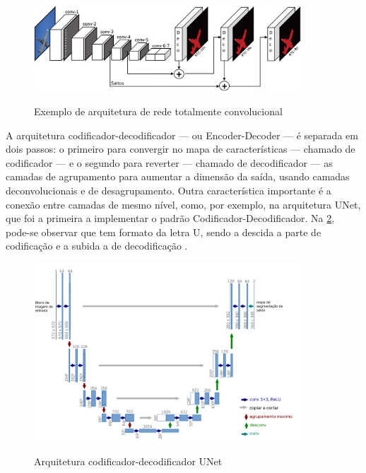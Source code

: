 \begin{figure}[ht]
    \caption{Exemplo de arquitetura de rede totalmente convolucional}
    \centering %
    \includegraphics[width=10cm]{figures/redes_totalmente_convolucionais.png} %
    \label{fig:rtc}
\end{figure}

A arquitetura codificador-decodificador — ou Encoder-Decoder — é separada em dois passos: o primeiro para convergir no mapa de características — chamado de codificador — e o segundo para reverter — chamado de decodificador — as camadas de agrupamento para aumentar a dimensão da saída, usando camadas deconvolucionais e de desagrupamento. Outra característica importante é a conexão entre camadas de mesmo nível, como, por exemplo, na arquitetura UNet, que foi a primeira a implementar o padrão Codificador-Decodificador. Na \cref{fig:unet}, pode-se observar que tem formato da letra U, sendo a descida a parte de codificação e a subida a de decodificação \space\cite{dp_semantic_segmantation, lapix, unetArq}.

\begin{figure}[ht]
    \caption{Arquitetura codificador-decodificador UNet}
    \centering %
    \includegraphics[width=10cm]{figures/unet.png} %
    \label{fig:unet}
\end{figure}


